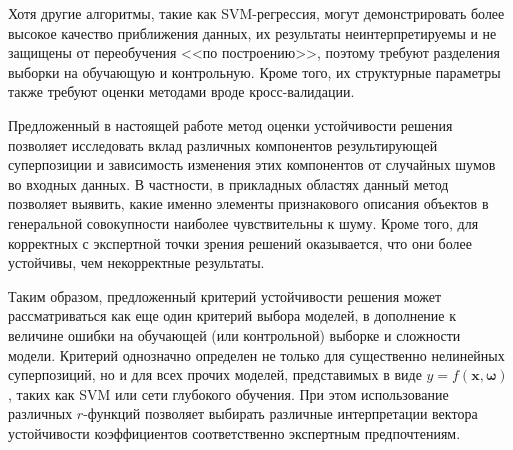 \documentclass[12pt,a4paper]{article}
\begin{document}
Хотя другие алгоритмы, такие как SVM-регрессия, могут демонстрировать более высокое
качество приближения данных, их результаты неинтерпретируемы и не защищены от переобучения
<<по построению>>, поэтому требуют разделения выборки на обучающую и контрольную. Кроме
того, их структурные параметры также требуют оценки методами вроде кросс-валидации.

Предложенный в настоящей работе метод оценки устойчивости решения позволяет исследовать вклад различных
компонентов результирующей суперпозиции и зависимость изменения этих компонентов от
случайных шумов во входных данных. В частности, в прикладных областях данный метод позволяет
выявить, какие именно элементы признакового описания объектов в генеральной совокупности
наиболее чувствительны к шуму. Кроме того, для корректных с экспертной точки зрения
решений оказывается, что они более устойчивы, чем некорректные результаты.

Таким образом, предложенный критерий устойчивости решения может рассматриваться как еще
один критерий выбора моделей, в дополнение к величине ошибки на обучающей (или
контрольной) выборке и сложности модели. Критерий однозначно определен не только для существенно
нелинейных суперпозиций, но и для всех прочих моделей, представимых в виде
$y = f(\mathbf{x}, \boldsymbol{\omega})$, таких как SVM или сети глубокого обучения.
При этом использование различных $r$-функций
позволяет выбирать различные интерпретации вектора устойчивости коэффициентов соответственно
экспертным предпочтениям.

\FloatBarrier



\end{document}
